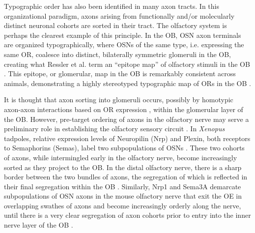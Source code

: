 \label{sec:Typography}
Typographic order has also been identified in many axon tracts.
In this organizational paradigm, axons arising from functionally and/or molecularly distinct neuronal cohorts are sorted in their tract.
The olfactory system is perhaps the clearest example of this principle. 
In the OB, OSN axon terminals are organized typographically, where OSNs of the same type, i.e. expressing the same OR, coalesce into distinct, bilaterally symmetric glomeruli in the OB, creating what Ressler et al. term an “epitope map” of olfactory stimuli in the OB \cite{ressler1994information,vassar1994topographic}.
This epitope, or glomerular, map in the OB is remarkably consistent across animals, demonstrating a highly stereotyped typographic map of ORs in the OB \cite{ressler1994information,vassar1994topographic}.

It is thought that axon sorting into glomeruli occurs, possibly by homotypic axon-axon interactions based on OR expression \cite{feinstein2004contextual}, within the glomerular layer of the OB.
However, pre-target ordering of axons in the olfactory nerve may serve a preliminary role in establishing the olfactory sensory circuit \cite{miller2010axon}.
In \emph{Xenopus} tadpoles, relative expression levels of Neuropilin (Nrp) and Plexin, both receptors to Semaphorins (Semas), label two subpopulations of OSNs \cite{satoda1995differential}.
These two cohorts of axons, while intermingled early in the olfactory nerve, become increasingly sorted as they project to the OB.
In the distal olfactory nerve, there is a sharp border between the two bundles of axons, the segregation of which is reflected in their final segregation within the OB \cite{satoda1995differential}.
Similarly, Nrp1 and Sema3A demarcate subpopulations of OSN axons in the mouse olfactory nerve that exit the OE in overlapping swathes of axons and become increasingly orderly along the nerve, until there is a very clear segregation of axon cohorts prior to entry into the inner nerve layer of the OB \cite{imai2009pre,miller2010axon}.

